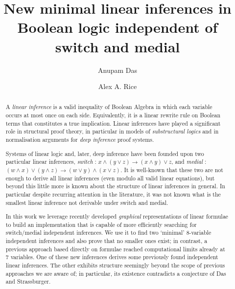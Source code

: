 \documentclass[a4paper, UKenglish, cleveref]{lipics-v2019}
\title{New minimal linear inferences in Boolean logic independent of switch and medial}%
\author{Anupam Das}{University of Birmingham, United Kingdom}{a.das@bham.ac.uk}{}{}
\author{Alex A. Rice}{University of Cambridge, United Kingdom}{alex.rice@cl.cam.ac.uk}{https://orcid.org/0000-0002-2698-5122}{}
\begin{document}
\maketitle

\begin{abstract}
A \emph{linear inference} is a valid inequality of Boolean Algebra in which each variable occurs at most once on each side.
Equivalently, it is a linear rewrite rule on Boolean terms that constitutes a true implication.
Linear inferences have played a significant role in structural proof theory, in particular in models of \emph{substructural logics} and in normalisation arguments for \emph{deep inference} proof systems.

Systems of linear logic and, later, deep inference have been founded upon two particular linear inferences, \emph{switch} : $x \land (y \lor z) \to (x \land y) \lor z$, and \emph{medial} : $(w \land x) \lor (y \land z) \to (w \lor y) \land (x \lor z)$.
It is well-known that these two are not enough to derive all linear inferences (even modulo all valid linear equations), but
beyond this little more is known about the structure of linear inferences in general.
In particular despite recurring attention in the literature, it was not known what is the smallest linear inference not derivable under switch and medial.


In this work we leverage recently developed \emph{graphical} representations of linear formulae to build an implementation that is capable of more efficiently searching for switch/medial independent inferences. We use it to find two `minimal' 8-variable independent inferences and also prove that no smaller ones exist; in contrast, a previous approach based directly on formulae reached computational limits already at 7 variables. One of these new inferences derives some previously found independent linear inferences. The other exhibits structure seemingly beyond the scope of previous approaches we are aware of; in particular, its existence contradicts a conjecture of Das and Strassburger.
\end{abstract}
\end{document}
